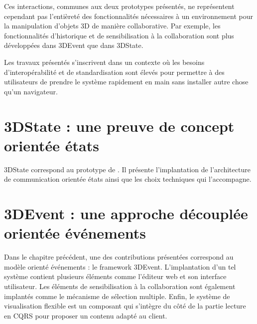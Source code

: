 Ces interactions, communes aux deux prototypes présentés, ne 
représentent cependant pas l'entièreté des fonctionnalités nécessaires à un 
environnement pour la manipulation d'objets 3D de manière 
collaborative. Par exemple, les fonctionnalités d'historique et de sensibilisation à 
la collaboration sont plus développées dans 3DEvent que dans 3DState.


Les travaux présentés s'inscrivent dans un contexte où les besoins 
d'interopérabilité et de standardisation sont élevés pour permettre à des 
utilisateurs de prendre le système rapidement en main sans installer autre chose 
qu'un navigateur.
\section{3DState : une preuve de concept orientée états}
\label{sec:3DState}
3DState correspond au prototype de 
\cite{Desprat2015a,Desprat2015b}. Il présente l'implantation de l'architecture de 
communication orientée états ainsi que les choix techniques qui l'accompagne.







\section{3DEvent : une approche découplée orientée événements}
\label{sec:3DEvent}
Dans le chapitre précédent, une des contributions présentées correspond au 
modèle orienté événements : le \gls{framework} 3DEvent. 
L'implantation d'un tel système contient plusieurs éléments comme l'éditeur 
web et son interface utilisateur. Les éléments de sensibilisation à la collaboration 
sont également implantés comme le mécanisme de sélection multiple. Enfin, le 
système de visualisation flexible est un composant qui s'intègre du côté de la 
partie lecture en \gls{CQRS} pour proposer un contenu adapté au client. 






